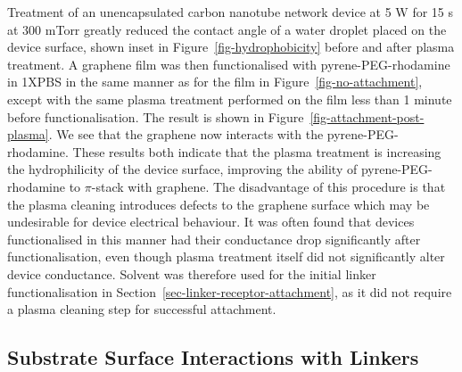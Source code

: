 \documentclass[
  a4paper,
]{scrbook}
\begin{document}
Treatment of an unencapsulated carbon nanotube network device at 5 W for
15 s at 300 mTorr greatly reduced the contact angle of a water droplet
placed on the device surface, shown inset in
Figure~\ref{fig-hydrophobicity} before and after plasma treatment. A
graphene film was then functionalised with pyrene-PEG-rhodamine in 1XPBS
in the same manner as for the film in Figure~\ref{fig-no-attachment},
except with the same plasma treatment performed on the film less than 1
minute before functionalisation. The result is shown in
Figure~\ref{fig-attachment-post-plasma}. We see that the graphene now
interacts with the pyrene-PEG-rhodamine. These results both indicate
that the plasma treatment is increasing the hydrophilicity of the device
surface, improving the ability of pyrene-PEG-rhodamine to \(\pi\)-stack
with graphene. The disadvantage of this procedure is that the plasma
cleaning introduces defects to the graphene surface which may be
undesirable for device electrical behaviour. It was often found that
devices functionalised in this manner had their conductance drop
significantly after functionalisation, even though plasma treatment
itself did not significantly alter device conductance. Solvent was
therefore used for the initial linker functionalisation in
Section~\ref{sec-linker-receptor-attachment}, as it did not require a
plasma cleaning step for successful attachment.

\hypertarget{sec-pyrene-interactions}{%
\subsection{Substrate Surface Interactions with
Linkers}\label{sec-pyrene-interactions}}
\end{document}

